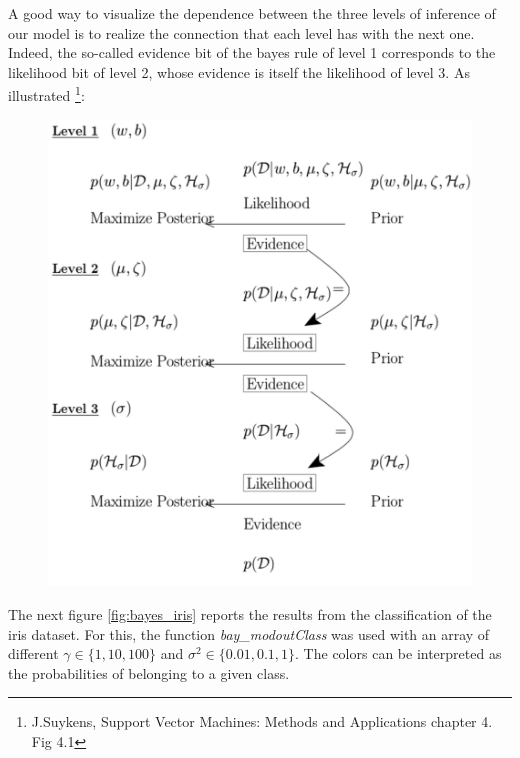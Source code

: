 \documentclass[11pt, a4paper]{article}
\begin{document}
A good way to visualize the dependence between the three levels of
inference of our model is to realize the connection that each level
has with the next one. Indeed, the so-called evidence bit of the bayes
rule of level 1 corresponds to the likelihood bit of level 2, whose
evidence is itself the likelihood of level 3. As illustrated
\footnote{J.Suykens, Support Vector Machines: Methods and Applications
chapter 4. Fig 4.1}:

\begin{figure}[H]
    \centering
    \includegraphics[scale=.46]{3level_bayesian.pdf}
    \label{fig:3level_bay1}
\end{figure}


The next figure \ref{fig:bayes_iris} reports the results from the
classification of the iris dataset. For this, the function
\emph{bay\_modoutClass} was used with an array of different
$\gamma \in \{1,10,100\}$ and $\sigma^2 \in \{0.01,0.1, 1\}$. The
colors can be interpreted as the probabilities of belonging to a given
class.
\end{document}
